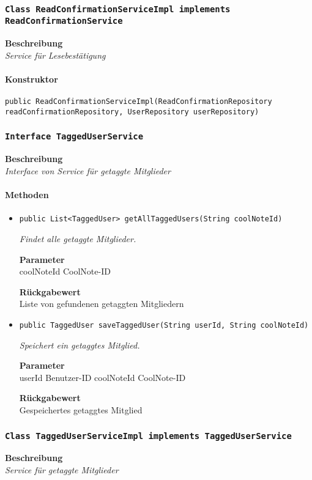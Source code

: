     \subsubsection{\texttt{Class ReadConfirmationServiceImpl implements ReadConfirmationService}}
    \textbf{Beschreibung} \\
    \textit{Service für Lesebestätigung}
    \paragraph*{Konstruktor}
    \texttt{public ReadConfirmationServiceImpl(ReadConfirmationRepository readConfirmationRepository, UserRepository userRepository)}
    \subsubsection{\texttt{Interface TaggedUserService}}
    \textbf{Beschreibung} \\
    \textit{Interface von Service für getaggte Mitglieder}
    \paragraph*{Methoden}
    \begin{itemize}
    	\item{\texttt{public List<TaggedUser> getAllTaggedUsers(String coolNoteId)}}
    	
    	\textit{Findet alle getaggte Mitglieder.}
    	
    	\textbf{Parameter} \\
    	coolNoteId CoolNote-ID
    	
    	\textbf{Rückgabewert} \\
    	Liste von gefundenen getaggten Mitgliedern        \item{\texttt{public TaggedUser saveTaggedUser(String userId, String coolNoteId)}}
    	
    	\textit{Speichert ein getaggtes Mitglied.}
    	
    	\textbf{Parameter} \\
    	userId Benutzer-ID
    	coolNoteId CoolNote-ID
    	
    	\textbf{Rückgabewert} \\
    	Gespeichertes getaggtes Mitglied
    \end{itemize}
    \subsubsection{\texttt{Class TaggedUserServiceImpl implements TaggedUserService}}
    \textbf{Beschreibung} \\
    \textit{Service für getaggte Mitglieder}
